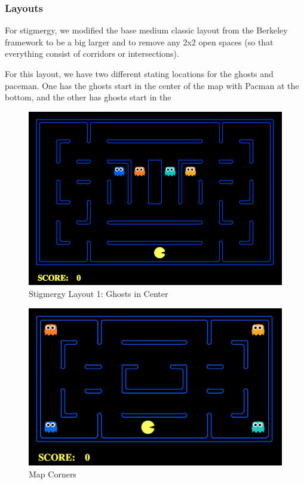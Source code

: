 \documentclass[11pt]{article}
\begin{document}
\begin{multicols}{2}
\subsubsection{Layouts}


For stigmergy, we modified the base medium classic layout from the Berkeley framework to be a big larger and to remove any 2x2 open spaces (so that everything consist of corridors or intersections).   

For this layout, we have two different stating locations for the ghosts and paceman.  One has the ghosts start in the center of the map with Pacman at the bottom, and the other has ghosts start in the

\begin{figure}[H]
	\includegraphics[width=\columnwidth]{StigmergyClassic1.png}
	\caption{Stigmergy Layout 1: Ghosts in Center}
	\label{fig:stigmap1}
\end{figure}


\begin{figure}[H]
	\includegraphics[width=\columnwidth]{mapcorners.png}
	\caption{Map Corners}
	\label{fig:stigmap2}
\end{figure}



\end{multicols}
\end{document}
